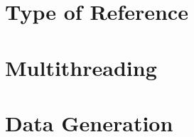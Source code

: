\section{Type of Reference}
\label{sec:history}
\clearpage

\section{Multithreading}
\label{sec:history}
\clearpage

\section{Data Generation}
\label{sec:history}
\clearpage

